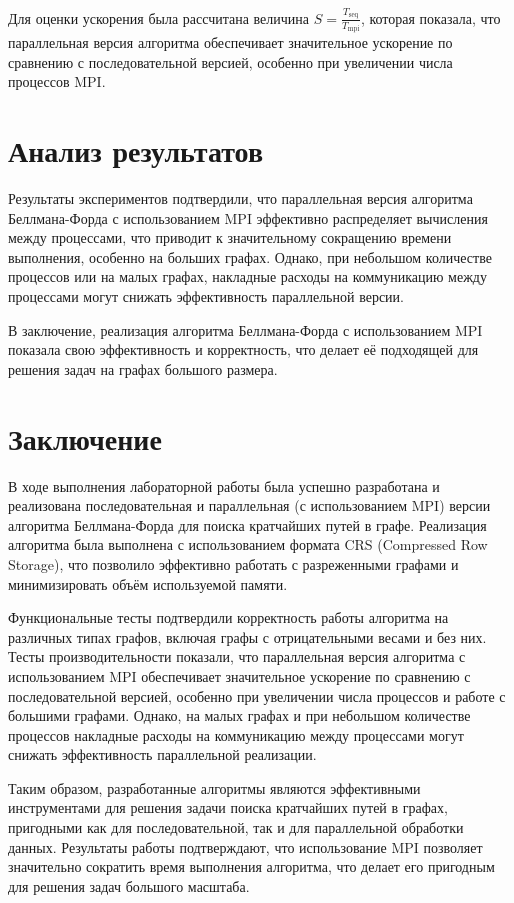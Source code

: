 \documentclass[12pt]{article}
\begin{document}
Для оценки ускорения была рассчитана величина \( S = \frac{T_{\text{seq}}}{T_{\text{mpi}}} \), которая показала, что параллельная версия алгоритма обеспечивает значительное ускорение по сравнению с последовательной версией, особенно при увеличении числа процессов MPI.

\section*{Анализ результатов}

Результаты экспериментов подтвердили, что параллельная версия алгоритма Беллмана-Форда с использованием MPI эффективно распределяет вычисления между процессами, что приводит к значительному сокращению времени выполнения, особенно на больших графах. Однако, при небольшом количестве процессов или на малых графах, накладные расходы на коммуникацию между процессами могут снижать эффективность параллельной версии.

В заключение, реализация алгоритма Беллмана-Форда с использованием MPI показала свою эффективность и корректность, что делает её подходящей для решения задач на графах большого размера.

\section*{Заключение}

В ходе выполнения лабораторной работы была успешно разработана и реализована последовательная и параллельная (с использованием MPI) версии алгоритма Беллмана-Форда для поиска кратчайших путей в графе. Реализация алгоритма была выполнена с использованием формата CRS (Compressed Row Storage), что позволило эффективно работать с разреженными графами и минимизировать объём используемой памяти.

Функциональные тесты подтвердили корректность работы алгоритма на различных типах графов, включая графы с отрицательными весами и без них. Тесты производительности показали, что параллельная версия алгоритма с использованием MPI обеспечивает значительное ускорение по сравнению с последовательной версией, особенно при увеличении числа процессов и работе с большими графами. Однако, на малых графах и при небольшом количестве процессов накладные расходы на коммуникацию между процессами могут снижать эффективность параллельной реализации.

Таким образом, разработанные алгоритмы являются эффективными инструментами для решения задачи поиска кратчайших путей в графах, пригодными как для последовательной, так и для параллельной обработки данных. Результаты работы подтверждают, что использование MPI позволяет значительно сократить время выполнения алгоритма, что делает его пригодным для решения задач большого масштаба.
\end{document}
